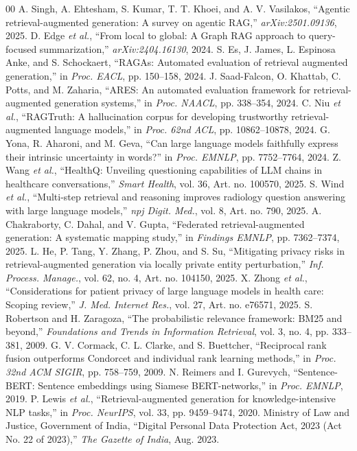 \documentclass[conference]{IEEEtran}
\begin{document}
\begin{thebibliography}{00}
 A. Singh, A. Ehtesham, S. Kumar, T. T. Khoei, and A. V. Vasilakos, ``Agentic retrieval-augmented generation: A survey on agentic RAG,'' \textit{arXiv:2501.09136}, 2025.
 D. Edge \textit{et al.}, ``From local to global: A Graph RAG approach to query-focused summarization,'' \textit{arXiv:2404.16130}, 2024.
 S. Es, J. James, L. Espinosa Anke, and S. Schockaert, ``RAGAs: Automated evaluation of retrieval augmented generation,'' in \textit{Proc. EACL}, pp. 150--158, 2024.
 J. Saad-Falcon, O. Khattab, C. Potts, and M. Zaharia, ``ARES: An automated evaluation framework for retrieval-augmented generation systems,'' in \textit{Proc. NAACL}, pp. 338--354, 2024.
 C. Niu \textit{et al.}, ``RAGTruth: A hallucination corpus for developing trustworthy retrieval-augmented language models,'' in \textit{Proc. 62nd ACL}, pp. 10862--10878, 2024.
 G. Yona, R. Aharoni, and M. Geva, ``Can large language models faithfully express their intrinsic uncertainty in words?'' in \textit{Proc. EMNLP}, pp. 7752--7764, 2024.
 Z. Wang \textit{et al.}, ``HealthQ: Unveiling questioning capabilities of LLM chains in healthcare conversations,'' \textit{Smart Health}, vol. 36, Art. no. 100570, 2025.
 S. Wind \textit{et al.}, ``Multi-step retrieval and reasoning improves radiology question answering with large language models,'' \textit{npj Digit. Med.}, vol. 8, Art. no. 790, 2025.
 A. Chakraborty, C. Dahal, and V. Gupta, ``Federated retrieval-augmented generation: A systematic mapping study,'' in \textit{Findings EMNLP}, pp. 7362--7374, 2025.
 L. He, P. Tang, Y. Zhang, P. Zhou, and S. Su, ``Mitigating privacy risks in retrieval-augmented generation via locally private entity perturbation,'' \textit{Inf. Process. Manage.}, vol. 62, no. 4, Art. no. 104150, 2025.
 X. Zhong \textit{et al.}, ``Considerations for patient privacy of large language models in health care: Scoping review,'' \textit{J. Med. Internet Res.}, vol. 27, Art. no. e76571, 2025.
 S. Robertson and H. Zaragoza, ``The probabilistic relevance framework: BM25 and beyond,'' \textit{Foundations and Trends in Information Retrieval}, vol. 3, no. 4, pp. 333--381, 2009.
 G. V. Cormack, C. L. Clarke, and S. Buettcher, ``Reciprocal rank fusion outperforms Condorcet and individual rank learning methods,'' in \textit{Proc. 32nd ACM SIGIR}, pp. 758--759, 2009.
 N. Reimers and I. Gurevych, ``Sentence-BERT: Sentence embeddings using Siamese BERT-networks,'' in \textit{Proc. EMNLP}, 2019.
 P. Lewis \textit{et al.}, ``Retrieval-augmented generation for knowledge-intensive NLP tasks,'' in \textit{Proc. NeurIPS}, vol. 33, pp. 9459--9474, 2020.
 Ministry of Law and Justice, Government of India, ``Digital Personal Data Protection Act, 2023 (Act No. 22 of 2023),'' \textit{The Gazette of India}, Aug. 2023.
\end{thebibliography}
\end{document}

